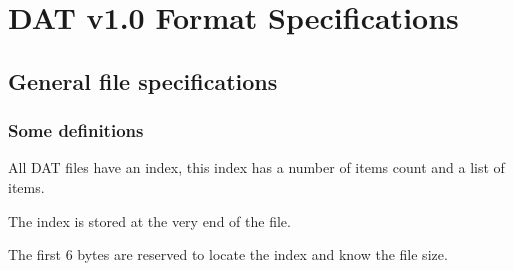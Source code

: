 \documentclass{article}
\begin{document}
\section{DAT v1.0 Format Specifications}

\subsection{General file specifications}
\subsubsection{Some definitions}

 All DAT files have an index, this index has a number of items count and
 a list of items.

 The index is stored at the very end of the file.

 The first 6 bytes are reserved to locate the index and know the file size.
\end{document}
